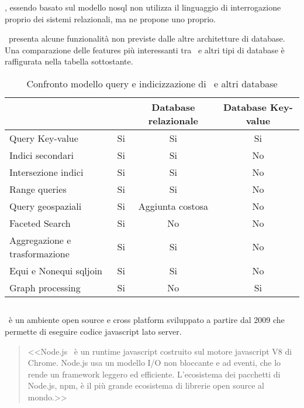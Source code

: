 \mongodb, essendo basato sul modello \acrshort{nosql} non utilizza il linguaggio di interrogazione proprio dei sistemi relazionali, ma ne propone uno proprio.

\mongodb~presenta alcune funzionalità non previste dalle altre architetture di database. Una comparazione delle features più interessanti tra \mongodb~e altri tipi di database è raffigurata nella tabella sottostante.
\begin{table}[!h]
	\caption{Confronto modello query e indicizzazione di \mongodb~e altri database\cite{mongodbarchitecture}}
	\centering
	\label{table:mongodbquerymodel}
	\begin{tabular}{c c c c}
		  & \mongodb & Database relazionale  & Database Key-value\\ 
		\midrule
		\multicolumn{1}{l}{Query Key-value} & Si & Si  & Si   \\
		\multicolumn{1}{l}{Indici secondari} & Si & Si  & No   \\
		\multicolumn{1}{l}{Intersezione indici} & Si & Si  & No   \\
		\multicolumn{1}{l}{Range queries} & Si & Si  & No   \\
		\multicolumn{1}{l}{Query geospaziali} & Si & Aggiunta costosa  & No   \\
		\multicolumn{1}{l}{Faceted Search} & Si & No  & No   \\
		\multicolumn{1}{l}{Aggregazione e trasformazione} & Si & Si  & No   \\
		\multicolumn{1}{l}{Equi e Nonequi \gls{sqljoin}} & Si & Si  & No   \\
		\multicolumn{1}{l}{Graph processing} & Si & No  & Si   \\
		\bottomrule
	\end{tabular}
\end{table}

\subsection{\nodejs}
\nodejs~è un ambiente open source e cross platform sviluppato a partire dal 2009 che permette di eseguire codice \gls{javascript} lato server.
\begin{quote}
	<<Node.js\textregistered ~ è un runtime \gls{javascript} costruito sul motore \gls{javascript} V8 di Chrome. Node.js usa un modello I/O non bloccante e ad eventi, che lo rende un framework leggero ed efficiente. L'ecosistema dei pacchetti di Node.js, npm, è il più grande ecosistema di librerie open source al mondo.>> \cite{nodejs}
\end{quote}

